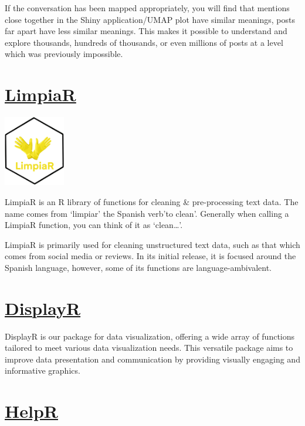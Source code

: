 \documentclass[
  letterpaper,
  DIV=11,
  numbers=noendperiod]{scrreprt}
\begin{document}
If the conversation has been mapped appropriately, you will find that
mentions close together in the Shiny application/UMAP plot have similar
meanings, posts far apart have less similar meanings. This makes it
possible to understand and explore thousands, hundreds of thousands, or
even millions of posts at a level which was previously impossible.

\section{\texorpdfstring{\href{https://github.com/jpcompartir/LimpiaR}{LimpiaR}}{LimpiaR}}\label{limpiar}

\includegraphics[width=0.2\textwidth,height=\textheight]{./img/hex/limpiar.png}

LimpiaR is an R library of functions for cleaning \& pre-processing text
data. The name comes from `limpiar' the Spanish verb'to clean'.
Generally when calling a LimpiaR function, you can think of it as
`clean\ldots{}'.

LimpiaR is primarily used for cleaning unstructured text data, such as
that which comes from social media or reviews. In its initial release,
it is focused around the Spanish language, however, some of its
functions are language-ambivalent.

\section{\texorpdfstring{\href{https://jpcompartir.github.io/DisplayR/}{DisplayR}}{DisplayR}}\label{displayr}

DisplayR is our package for data visualization, offering a wide array of
functions tailored to meet various data visualization needs. This
versatile package aims to improve data presentation and communication by
providing visually engaging and informative graphics.

\section{\texorpdfstring{\href{https://avery-island.github.io/HelpR/index.html}{HelpR}}{HelpR}}\label{helpr}
\end{document}
